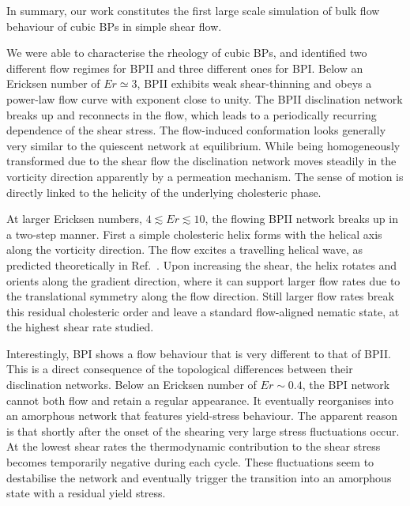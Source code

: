 \documentclass[8.5pt,twoside,twocolumn]{article}
\begin{document}
{In summary, our work constitutes the first large scale simulation of bulk flow behaviour 
of cubic BPs in simple shear flow. 
  
We were able to characterise the rheology of cubic BPs, and identified 
two different flow regimes for BPII and three different ones for BPI. 
Below an Ericksen number of $Er\simeq3$, BPII exhibits weak shear-thinning and 
obeys a power-law flow curve with exponent close to unity.  
The BPII disclination network breaks up and reconnects 
in the flow, which leads to a periodically recurring dependence 
of the shear stress. The flow-induced conformation looks generally
very similar to the quiescent network at equilibrium. 
While being homogeneously transformed due to the shear flow
the disclination network moves steadily in the vorticity direction
apparently by a permeation mechanism. The sense of
motion is directly linked to the helicity of the underlying cholesteric phase.

At larger Ericksen numbers, $4\lesssim Er\lesssim 10$, the flowing BPII network 
breaks up in a two-step manner. First a simple cholesteric helix forms with the helical axis 
along the vorticity direction. The flow excites a travelling helical wave,
as predicted theoretically in Ref.~\cite{Rey:1996a,Rey:1996b}.
Upon increasing the shear, the helix rotates and orients along the
gradient direction, where it can support larger flow rates due to the translational
symmetry along the flow direction. Still larger flow rates break this residual
cholesteric order and leave a standard flow-aligned nematic state,
at the highest shear rate studied.

Interestingly, BPI shows a flow behaviour that is very different to that of BPII.
This is a direct consequence of the topological differences between their disclination 
networks. Below an Ericksen number of $Er\sim 0.4$, the BPI network cannot both flow and 
retain a regular appearance. It eventually reorganises into an amorphous network that
features yield-stress behaviour. The apparent reason is that shortly after the onset of the shearing 
very large stress fluctuations occur. At the lowest shear rates
the thermodynamic contribution to the shear stress becomes temporarily 
negative during each cycle. These fluctuations seem to destabilise the network and 
eventually trigger the transition into an amorphous state with a residual yield
stress. 

}
\end{document}
